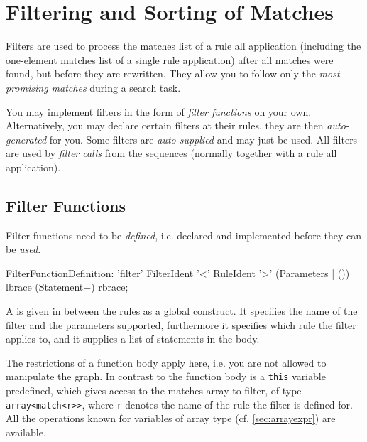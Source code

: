 \chapter{Filtering and Sorting of Matches}\label{sub:filters}

Filters are used to process the matches list of a rule all application (including the one-element matches list of a single rule application) after all matches were found, but before they are rewritten.
They allow you to follow only the \emph{most promising matches} during a search task.

You may implement filters in the form of \emph{filter functions} on your own.
Alternatively, you may declare certain filters at their rules, they are then \emph{auto-generated} for you.
Some filters are \emph{auto-supplied} and may just be used.
All filters are used by \emph{filter calls} from the sequences (normally together with a rule all application).


\section{Filter Functions}

Filter functions need to be \emph{defined}, i.e. declared and implemented before they can be \emph{used}.

\begin{rail}
	FilterFunctionDefinition: 'filter' FilterIdent '<' RuleIdent '>' (Parameters | ()) \\ lbrace (Statement+) rbrace;
\end{rail}

A  is given in between the rules as a global construct.
It specifies the name of the filter and the parameters supported, furthermore it specifies which rule the filter applies to, and it supplies a list of statements in the body. 

The restrictions of a function body apply here, i.e. you are not allowed to manipulate the graph.
In contrast to the function body is a \texttt{this} variable predefined, which gives access to the matches array to filter, of type \texttt{array<match<r>>}, where \texttt{r} denotes the name of the rule the filter is defined for.
All the operations known for variables of array type (cf. \ref{sec:arrayexpr}) are available.

